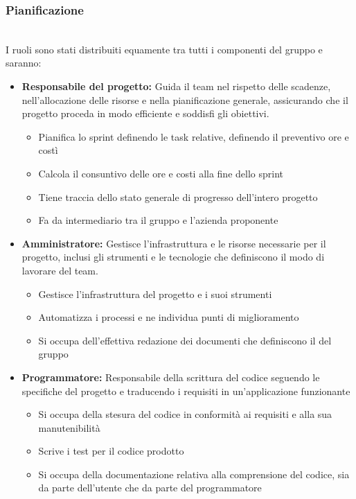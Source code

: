 \subsubsection{Pianificazione}
\\
I ruoli sono stati distribuiti equamente tra tutti i componenti del gruppo e saranno:
\begin{itemize}
	\item \textbf{Responsabile del progetto:} Guida il team nel rispetto delle scadenze, nell'allocazione delle risorse e nella pianificazione generale, assicurando che il progetto proceda in modo efficiente e soddisfi gli obiettivi.
	\begin{itemize}
    \item{Pianifica lo sprint definendo le task relative, definendo il preventivo ore e costì}
    \item{Calcola il consuntivo delle ore e costi alla fine dello sprint}
    \item{Tiene traccia dello stato generale di progresso dell'intero progetto}
    \item{Fa da intermediario tra il gruppo e l'azienda proponente}
  \end{itemize}
	\item \textbf{Amministratore:} Gestisce l'infrastruttura e le risorse necessarie per il progetto, inclusi gli strumenti e le tecnologie che definiscono il modo di lavorare del team.
	\begin{itemize}
    \item{Gestisce l'infrastruttura del progetto e i suoi strumenti}
    \item{Automatizza i processi e ne individua punti di miglioramento}
    \item{Si occupa dell'effettiva redazione dei documenti che definiscono il  del gruppo}
	\end{itemize}
  \item \textbf{Programmatore:} Responsabile della scrittura del codice seguendo le specifiche del progetto e traducendo i requisiti in un'applicazione funzionante
	\begin{itemize}
    \item{Si occupa della stesura del codice in conformità ai requisiti e alla sua manutenibilità}
    \item{Scrive i test per il codice prodotto}
    \item{Si occupa della documentazione relativa alla comprensione del codice, sia da parte dell'utente che da parte del programmatore}

\end{itemize}
\end{itemize}
